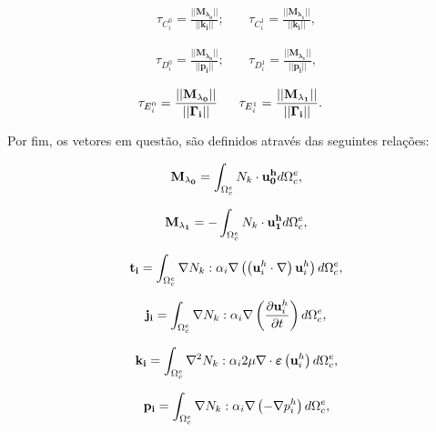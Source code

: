 \documentclass[tese_patricia]{subfiles}
\begin{document}
\begin{align}
	\tau_{C_i^{0}} = \frac{|| \mathbf{M_{\lambda_0}} || }{||\mathbf{k_{i}} ||}; \ \ \ \ \  & \tau_{C_i^{1}} = \frac{|| \mathbf{M_{\lambda_1}} || }{||\mathbf{k_{i}} ||},
\end{align}


\begin{align}
	\tau_{D_i^{0}} = \frac{|| \mathbf{M_{\lambda_0}} || }{||\mathbf{p_{i}} ||}; \ \ \ \ \  & \tau_{D_i^{1}} = \frac{|| \mathbf{M_{\lambda_1}} || }{||\mathbf{p_{i}} ||}, 
\end{align}


\begin{align}
	\tau_{E_i^{0}} = \frac{|| \mathbf{M_{\lambda_0}} || }{||\mathbf{\Gamma_{i}} ||} \ \ \ \ \  & \tau_{E_i^{1}} = \frac{|| \mathbf{M_{\lambda_1}} || }{||\mathbf{\Gamma_{i}} ||}.
\end{align}

Por fim, os vetores em questão, são definidos através das seguintes relações:


\begin{align}
	\mathbf{M_{\lambda_0}} = \int_{\Omega_{c}^{e}} N_{k} \cdot \mathbf{u_{0}^{h}} d\Omega_{c}^{e},
\end{align}

\begin{align}
	\mathbf{M_{\lambda_1}} = - \int_{\Omega_{c}^{e}} N_{k} \cdot \mathbf{u_{1}^{h}} d\Omega_{c}^{e},
\end{align}

\begin{align}
	\mathbf{t_{i}} = \int_{\Omega_{c}^{e}} \nabla N_{k} : \alpha_{i} \nabla \left( \left( \mathbf{u}_i^{h} \cdot  \nabla \right) \mathbf{u}_i^{h} \right)  d\Omega_{c}^{e},
\end{align}

\begin{align}
	\mathbf{j_{i}} = \int_{\Omega_{c}^{e}} \nabla N_{k} :  \alpha_{i} \nabla \left(\frac{\partial\mathbf{u}_i^{h}}{\partial t}  \right)  d\Omega_{c}^{e},
\end{align}

\begin{align}
	\mathbf{k_{i}} = \int_{\Omega_{c}^{e}} \nabla^{2} N_{k} : \alpha_{i} 2 \mu \nabla \cdot \bm{\varepsilon} \left(\mathbf{u}_i^{h}\right)    d\Omega_{c}^{e},
\end{align}

\begin{align}
	\mathbf{p_{i}} = \int_{\Omega_{c}^{e}} \nabla N_{k} : \alpha_{i} \nabla \left(-\nabla p_i^h\right)    d\Omega_{c}^{e},
\end{align}
\end{document}
